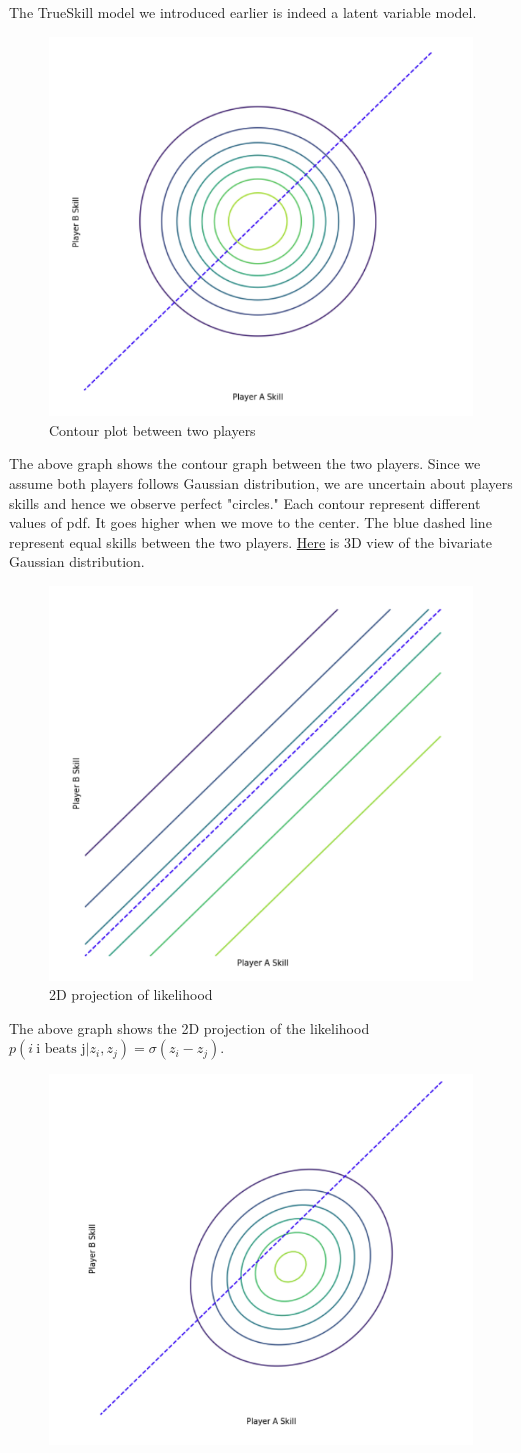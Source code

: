 \begin{example}
    The TrueSkill model we introduced earlier is indeed a latent variable model.
    \begin{figure}[H]
        \centering
        \includegraphics[width = .4\linewidth]{codes/figures/section8/figure_8_1.png}
        \caption{Contour plot between two players}
        \label{fig:prior_trueskill}
    \end{figure}
    The above graph shows the contour graph between the two players. Since we assume both players follows Gaussian distribution, we are uncertain about players skills and hence we observe perfect "circles." Each contour represent different values of pdf. It goes higher when we move to the center. The blue dashed line represent equal skills between the two players. \href{https://en.wikipedia.org/wiki/Multivariate_normal_distribution#/media/File:Multivariate_Gaussian.png}{Here} is 3D view of the bivariate Gaussian distribution.
    \begin{figure}[H]
        \centering
        \includegraphics[width = .4\linewidth]{codes/figures/section8/figure_8_2.png}
        \caption{2D projection of likelihood}
        \label{fig:likelihood_trueskill}
    \end{figure}
    The above graph shows the 2D projection of the likelihood $p(i\:\text{i beats j}|z_i,z_j)=\sigma(z_i-z_j)$.
    \begin{figure}[H]
        \centering
        \includegraphics[width = .4\linewidth]{codes/figures/section8/figure_8_3.png}

\end{figure}
\end{example}
